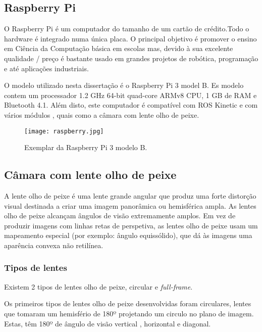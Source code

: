 \subsection{Raspberry Pi}

O Raspberry Pi é um computador do tamanho de um cartão de crédito.Todo o hardware é integrado numa única placa. O principal objetivo é promover o ensino em Ciência da Computação básica em escolas mas, devido à sua excelente qualidade / preço é bastante usado em grandes projetos de robótica, programação e até aplicações industriais. 

O modelo utilizado nesta dissertação é o Raspberry Pi 3 model B. Es modelo contem um processador 1.2 GHz 64-bit quad-core ARMv8 CPU, 1 GB de RAM e Bluetooth 4.1. Além disto, este computador é compatível com ROS Kinetic e com vários módulos , quais como a câmara com lente olho de peixe.

\begin{figure}[h!] %
	\begin{center}
		\leavevmode		
		\texttt{[image: raspberry.jpg]}
		\caption{Exemplar da Raspberry Pi 3 modelo B.}
		\label{fig:raspberry}
	\end{center}
\end{figure}

\subsection{Câmara com lente olho de peixe}

A lente olho de peixe é uma lente grande angular que produz uma forte distorção visual destinada a criar uma imagem panorâmica ou hemisférica ampla. As lentes olho de peixe alcançam ângulos de visão extremamente amplos. Em vez de produzir imagens com linhas retas de perspetiva, as lentes olho de peixe usam um mapeamento especial (por exemplo: ângulo equissólido), que dá às imagens uma aparência convexa não retilínea.

\subsubsection{Tipos de lentes}

Existem 2 tipos de lentes olho de peixe, circular e \textit{full-frame}. 

Os primeiros tipos de lentes olho de peixe desenvolvidas foram circulares, lentes que tomaram um hemisfério de 180º projetando um circulo no plano de imagem. Estas, têm 180º de ângulo de visão vertical , horizontal e diagonal. 

